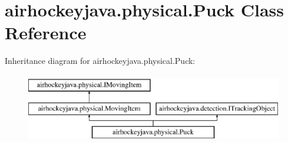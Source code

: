 \hypertarget{classairhockeyjava_1_1physical_1_1_puck}{}\section{airhockeyjava.\+physical.\+Puck Class Reference}
\label{classairhockeyjava_1_1physical_1_1_puck}
Inheritance diagram for airhockeyjava.\+physical.\+Puck\+:\begin{figure}[H]
\begin{center}
\leavevmode
\includegraphics[height=3.000000cm]{classairhockeyjava_1_1physical_1_1_puck}
\end{center}
\end{figure}
